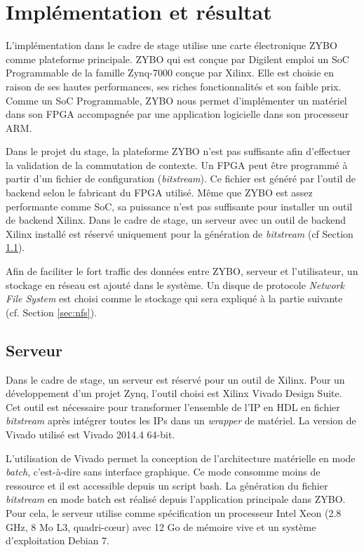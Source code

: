 \chapter{Implémentation et résultat}
\label{chap:implementation}
L'implémentation dans le cadre de stage utilise une carte électronique ZYBO\cite{zyboweb}
comme plateforme principale. ZYBO qui est conçue par Digilent emploi un SoC Programmable de la famille Zynq-7000 conçue par Xilinx.
Elle est choisie en raison de ses hautes performances, ses riches fonctionnalités et son faible prix. 
Comme un SoC Programmable, ZYBO nous permet d'implémenter
un matériel dans son FPGA accompagnée par une application logicielle dans son processeur ARM.

Dans le projet du stage, la plateforme ZYBO n'est pas suffisante afin d'effectuer la validation de
la commutation de contexte. Un FPGA peut être programmé à partir d'un fichier de configuration (\emph{bitstream}).
Ce fichier est généré par l'outil de backend selon le fabricant du FPGA utilisé.
Même que ZYBO est assez performante comme SoC, sa puissance n'est pas suffisante pour
installer un outil de backend Xilinx. Dans le cadre de stage, un serveur avec un outil de backend Xilinx installé est réservé uniquement pour la génération de
\emph{bitstream} (cf Section \ref{sec:serveur}).

Afin de faciliter le fort traffic des données entre ZYBO, serveur et l'utilisateur, un stockage en réseau
est ajouté dans le système. Un disque de protocole \emph{Network File System} est choisi comme le stockage
qui sera expliqué à la partie suivante (cf. Section \ref{sec:nfs}).

\section{Serveur}
\label{sec:serveur}
Dans le cadre de stage, un serveur est réservé pour un outil de Xilinx.
Pour un développement d'un projet Zynq, l'outil choisi est Xilinx Vivado Design Suite.
Cet outil est nécessaire pour transformer l'ensemble de l'IP en HDL en fichier \emph{bitstream} après
intégrer toutes les IPs dans un \emph{wrapper} de matériel.
La version de Vivado utilisé est Vivado 2014.4 64-bit.

L'utilisation de Vivado permet la conception de l'architecture matérielle en mode \emph{batch}, c'est-à-dire sans interface
graphique. Ce mode consomme moins de ressource et il est accessible depuis un script bash.
La génération du fichier \emph{bitstream} en mode batch est réalisé depuis
l'application principale dans ZYBO. Pour cela,
le serveur utilise comme spécification un processeur Intel Xeon (2.8 GHz, 8 Mo L3, quadri-cœur)
avec 12 Go de mémoire vive et un système d'exploitation Debian 7.

